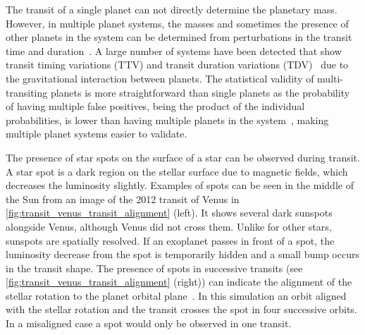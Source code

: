 The transit of a single planet can not directly determine the planetary mass.
However, in multiple planet systems, the masses and sometimes the presence of other planets in the system can be determined from perturbations in the transit time and duration~\citep[e.g.][]{holman_use_2005, holman_kepler9_2010}.
A large number of systems have been detected that show transit timing variations (TTV) and transit duration variations (TDV)~\citep[e.g.][]{holczer_transit_2016} due to the gravitational interaction between planets.
The statistical validity of multi-transiting planets is more straightforward than single planets as the probability of having multiple false positives, being the product of the individual probabilities, is lower than having multiple planets in the system~\citep{lissauer_almost_2012}, making multiple planet systems easier to validate.

The presence of star spots on the surface of a star can be observed during transit.
A star spot is a dark region on the stellar surface due to magnetic fields, which decreases the luminosity slightly.
Examples of spots can be seen in the middle of the Sun from an image of the 2012 transit of Venus in \cref{fig:transit_venus_transit_alignment} (left).
It shows several dark sunspots alongside Venus, although Venus did not cross them.
Unlike for other stars, sunspots are spatially resolved.
If an exoplanet passes in front of a spot, the luminosity decrease from the spot is temporarily hidden and a small bump occurs in the transit shape.
The presence of spots in successive transits (see \cref{fig:transit_venus_transit_alignment} (right)) can indicate the alignment of the stellar rotation to the planet orbital plane~\citep{sanchis-ojeda_starspots_2013}.
In this simulation an orbit aligned with the stellar rotation and the transit crosses the spot in four successive orbits.
In a misaligned case a spot would only be observed in one transit.

